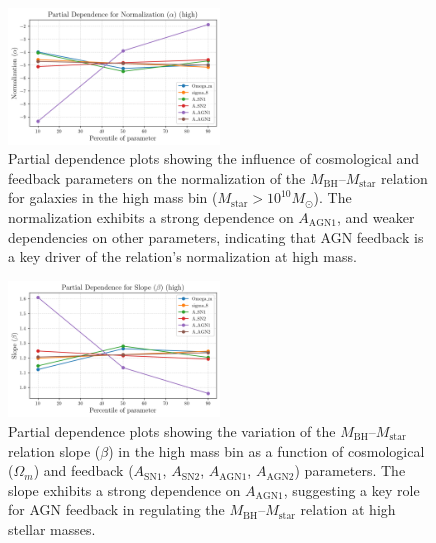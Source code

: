 \documentclass[twocolumn]{aastex631}
\begin{document}
\begin{figure}[ht!]
    \centering
    \includegraphics[width=0.5\textwidth]{../Project5/plots/pdp_Normalization_alpha_high_116_20250423_182620.png}
    \caption{Partial dependence plots showing the influence of cosmological and feedback parameters on the normalization of the $M_\mathrm{BH}$–$M_\mathrm{star}$ relation for galaxies in the high mass bin ($M_\mathrm{star} > 10^{10} M_\odot$). The normalization exhibits a strong dependence on $A_\mathrm{AGN1}$, and weaker dependencies on other parameters, indicating that AGN feedback is a key driver of the relation's normalization at high mass.
}
    \label{fig:pdp_norm_high}
\end{figure}

\begin{figure}[ht!]
    \centering
    \includegraphics[width=0.5\textwidth]{../Project5/plots/pdp_Slope_beta_high_113_20250423_182618.png}
    \caption{Partial dependence plots showing the variation of the $M_\mathrm{BH}$–$M_\mathrm{star}$ relation slope ($\beta$) in the high mass bin as a function of cosmological ($\Omega_m$) and feedback ($A_\mathrm{SN1}$, $A_\mathrm{SN2}$, $A_\mathrm{AGN1}$, $A_\mathrm{AGN2}$) parameters. The slope exhibits a strong dependence on $A_\mathrm{AGN1}$, suggesting a key role for AGN feedback in regulating the $M_\mathrm{BH}$–$M_\mathrm{star}$ relation at high stellar masses.
}
    \label{fig:pdp_slope_high}
\end{figure}
\end{document}
